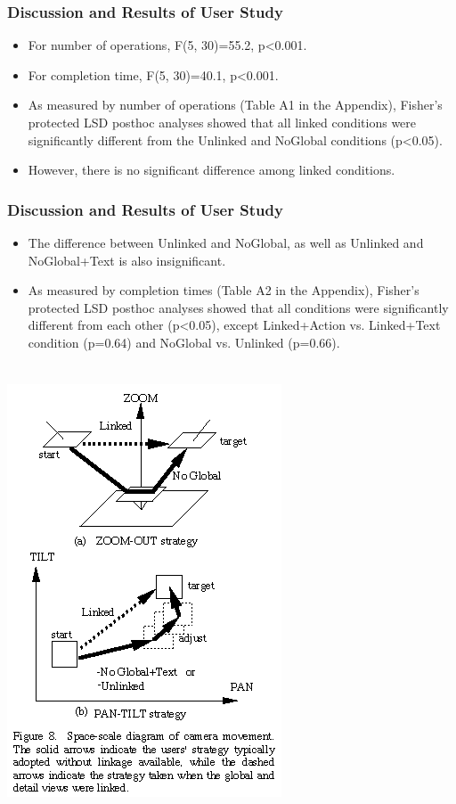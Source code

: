 \documentclass{beamer}
\begin{document}
\begin{frame}
\frametitle{Discussion and Results of User Study}

\begin{itemize}
\item For number of operations, F(5, 30)=55.2, p<0.001.
\item For completion time, F(5, 30)=40.1, p<0.001.
\item As measured by number of operations (Table A1 in the Appendix), Fisher's protected LSD posthoc analyses showed that all linked conditions were significantly different from the Unlinked and NoGlobal conditions (p<0.05).
\item However, there is no significant difference among linked conditions.
\end{itemize}

\end{frame}

\begin{frame}
\frametitle{Discussion and Results of User Study}

\begin{itemize}
\item The difference between Unlinked and NoGlobal, as well as Unlinked and NoGlobal+Text is also insignificant.
\item As measured by completion times (Table A2 in the Appendix), Fisher's protected LSD posthoc analyses showed that all conditions were significantly different from each other (p<0.05), except Linked+Action vs. Linked+Text condition (p=0.64) and NoGlobal vs. Unlinked (p=0.66).
\end{itemize}

\end{frame}

\begin{frame}
\frametitle{}


\begin{columns}

\centerline{\includegraphics[width=0.500000\linewidth,keepaspectratio]{ky_fg8.png}}

\end{columns}

\end{frame}
\end{document}
